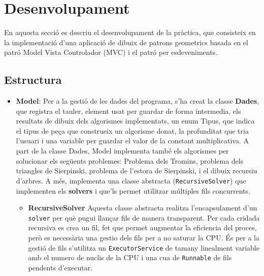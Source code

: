 \documentclass{ieeetj}
\begin{document}
\section{Desenvolupament}
En aquesta secció es descriu el desenvolupament de la pràctica, que consisteix en la implementació d'una aplicació de dibuix de patrons geometrics basada en el patró Model Vista Controlador (MVC) i el patró per esdeveniments.

\subsection{Estructura}

\begin{itemize}
    \item \textbf{Model}: 
    Per a la gestió de les dades del programa, s'ha creat la classe \textbf{Dades}, que registra el tauler, element usat per guardar de forma intermedia, els resultats de dibuix dels algorismes implementats, un enum Tipus, que indica el tipus de peça que construeix un algorisme donat, la profunditat que tria l'usuari i una variable per guardar el valor de la constant multiplicativa.
    A part de la classe Dades, Model implementa també els algorismes per solucionar els següents problemes:
    Problema dels Tromins, problema dels triangles de Sierpinski, problema de l'estora de Sierpinski, i el dibuix recursiu d'arbres. A més, implementa una classe abstracta (\texttt{RecursiveSolver}) que implementen els \textbf{solvers} i que'ls permet utilitzar múltiples fils concurrents.
    \begin{itemize}
        \item\textbf{RecursiveSolver} Aquesta classe abstracta realitza l'encapsulament d'un \texttt{solver} per què pugui llançar fils de manera transparent.
    Per cada cridada recursiva es crea un fil, fet que permet augmentar la eficiencia del proces, però es necessària una gestio dels fils per a no saturar la CPU.
    És per a la gestió de fils s'utilitza un \texttt{ExecutorService} de tamany linealment variable amb el numero de nuclis de la CPU i una cua de \texttt{Runnable} de fils pendents d'executar.
    \end{itemize}
    
    


\end{itemize}
\end{document}
